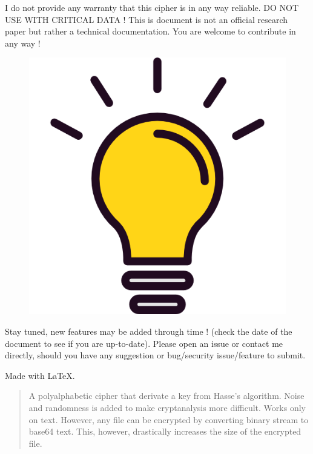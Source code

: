 \documentclass{article}
\begin{document}
I do not provide any warranty that this cipher is in any way reliable.
DO NOT USE WITH CRITICAL DATA !
\newline
This is document is not an official research paper but rather a technical documentation. You are welcome to contribute in any way !

\begin{figure}[H]
    \centering
    \includegraphics[scale=0.18]{bulb}
\end{figure}

Stay tuned, new features may be added through time ! (check the date of the document to see if you are up-to-date). Please open an issue or contact me directly,
should you have any suggestion or bug/security issue/feature to submit.

Made with \LaTeX.

\newblock


\begin{abstract}
    A polyalphabetic cipher that derivate a key from Hasse's algorithm. Noise and randomness is added to make cryptanalysis more difficult.
    Works only on text. However, any file can be encrypted by converting binary stream to base64 text. This, however, drastically increases the
    size of the encrypted file.
\end{abstract}
\end{document}
